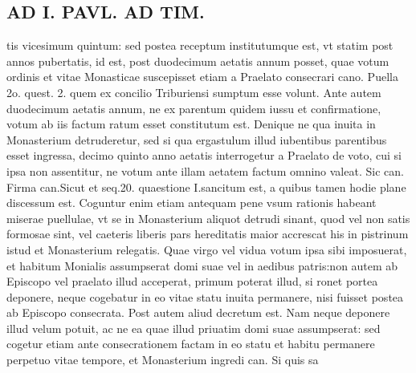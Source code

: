 \documentclass{article}
\begin{document}
\begin{pages}
\section*{AD I. PAVL. AD TIM. }
\marginpar{[ p.294 ]}\pstart tis vicesimum quintum: sed postea receptum institutumque est, vt statim post annos pubertatis, id est, post duodecimum aetatis annum posset, quae votum ordinis et vitae Monasticae suscepisset etiam a Praelato consecrari cano. Puella 2o. quest. 2. quem ex concilio Triburiensi sumptum esse volunt. Ante autem duodecimum aetatis annum, ne ex parentum quidem iussu et confirmatione, votum ab iis factum ratum esset constitutum est. Denique ne qua inuita in Monasterium detruderetur, sed si qua ergastulum illud iubentibus parentibus esset ingressa, decimo quinto anno aetatis interrogetur a Praelato de voto, cui si ipsa non assentitur, ne votum ante illam aetatem factum omnino valeat. Sic can. Firma can.Sicut et seq.20. quaestione I.sancitum est, a quibus tamen hodie plane discessum est. Coguntur enim etiam antequam pene vsum rationis habeant miserae puellulae, vt se in Monasterium aliquot detrudi sinant, quod vel non satis formosae sint, vel caeteris liberis pars hereditatis maior accrescat his in pistrinum istud et Monasterium relegatis.  \pend\pstart Quae virgo vel vidua votum ipsa sibi imposuerat, et habitum Monialis assumpserat domi suae vel in aedibus patris:non autem ab Episcopo vel praelato illud acceperat, primum poterat illud, si ronet portea deponere, neque cogebatur in eo vitae statu inuita permanere, nisi fuisset postea ab Episcopo consecrata. Post autem aliud decretum est. Nam neque deponere illud velum potuit, ac ne ea quae illud priuatim domi suae assumpserat: sed cogetur etiam ante consecrationem factam in eo statu et habitu permanere perpetuo vitae tempore, et Monasterium ingredi can. Si quis sa\pend

\end{pages}
\end{document}
